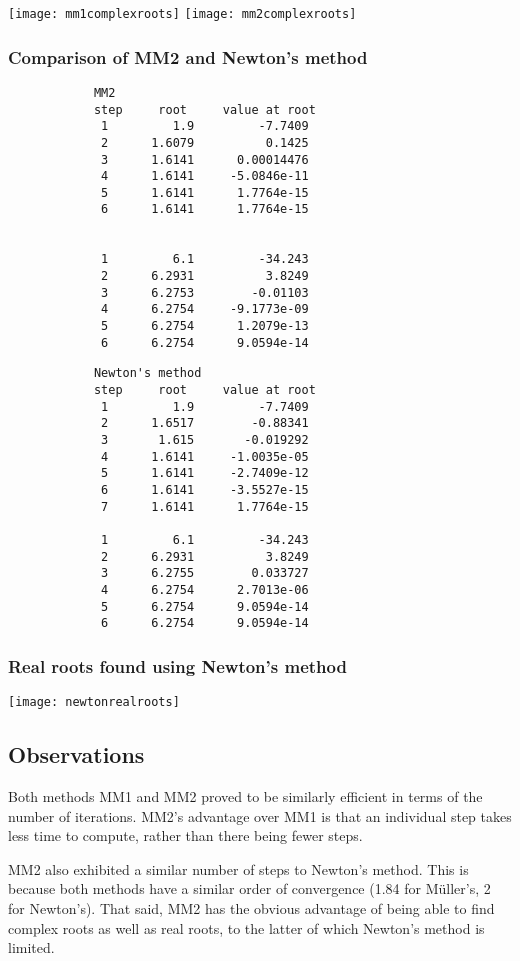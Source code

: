 \documentclass{article}
\begin{document}
	\texttt{[image: mm1complexroots]}
	\texttt{[image: mm2complexroots]}
	
	\newpage
	\subsubsection{Comparison of MM2 and Newton's method}
	
		\begin{multicols}{2}
		\begin{verbatim}
			MM2
			step     root     value at root
			 1         1.9         -7.7409 
			 2      1.6079          0.1425 
			 3      1.6141      0.00014476 
			 4      1.6141     -5.0846e-11 
			 5      1.6141      1.7764e-15 
			 6      1.6141      1.7764e-15 
			 

			 1         6.1         -34.243 
			 2      6.2931          3.8249 
			 3      6.2753        -0.01103 
			 4      6.2754     -9.1773e-09 
			 5      6.2754      1.2079e-13 
			 6      6.2754      9.0594e-14 
		\end{verbatim}
		\begin{verbatim}
			Newton's method
			step     root     value at root
			 1         1.9         -7.7409 
			 2      1.6517        -0.88341 
			 3       1.615       -0.019292 
			 4      1.6141     -1.0035e-05 
			 5      1.6141     -2.7409e-12 
			 6      1.6141     -3.5527e-15 
			 7      1.6141      1.7764e-15 
			 
			 1         6.1         -34.243  
			 2      6.2931          3.8249  
			 3      6.2755        0.033727  
			 4      6.2754      2.7013e-06  
			 5      6.2754      9.0594e-14  
			 6      6.2754      9.0594e-14  
		\end{verbatim}
	\end{multicols}
	
	\subsubsection{Real roots found using Newton's method}
	
	\texttt{[image: newtonrealroots]}
	
	\subsection{Observations}
	
	Both methods MM1 and MM2 proved to be similarly efficient in terms of the
	number of iterations. MM2's advantage over MM1 is that an individual step
	takes less time to compute, rather than there being fewer steps.
	
	MM2 also exhibited a similar number of steps to Newton's method. This is
	because both methods have a similar order of convergence (1.84 for
	M{\"u}ller's, 2 for Newton's). That said, MM2 has the obvious advantage of
	being able to find complex roots as well as real roots, to the latter of
	which Newton's method is limited.
	
\end{document}
